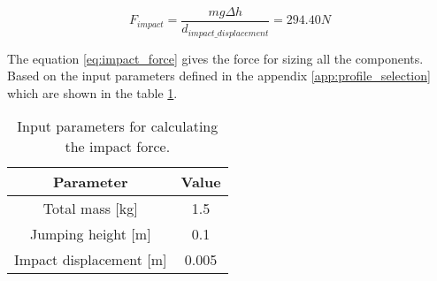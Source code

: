 \begin{equation}
\label{eq:impact_force}
  F_{impact} = \frac{m g \Delta h}{d_{impact\_displacement}} = 294.40 N 
\end{equation}

The equation \ref{eq:impact_force} gives the force for sizing all the components.
Based on the input parameters defined in the appendix \ref{app:profile_selection} which are shown in the table \ref{tab:input_parameter_impact_force}.
\begin{table}
\begin{center}
\begin{tabular}{c | c}
  Parameter & Value \\
  \hline
  Total mass [kg] & 1.5 \\
  Jumping height [m] & 0.1 \\
  Impact displacement [m] & 0.005
\end{tabular}
\caption{Input parameters for calculating the impact force.}
\label{tab:input_parameter_impact_force}
\end{center}
\end{table}
